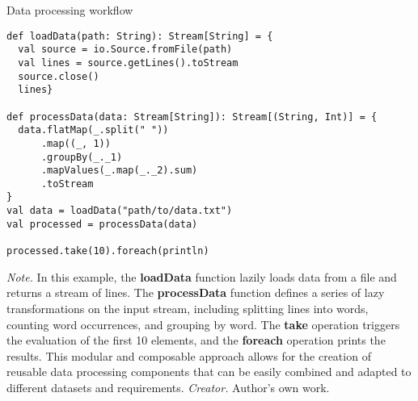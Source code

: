 \begin{table}[h!]
\caption{Data processing workflow}
\begin{lstlisting}
def loadData(path: String): Stream[String] = {
  val source = io.Source.fromFile(path)
  val lines = source.getLines().toStream
  source.close()
  lines}
  
def processData(data: Stream[String]): Stream[(String, Int)] = {
  data.flatMap(_.split(" "))
      .map((_, 1))
      .groupBy(_._1)
      .mapValues(_.map(_._2).sum)
      .toStream
}
val data = loadData("path/to/data.txt")
val processed = processData(data)

processed.take(10).foreach(println)
\end{lstlisting}
\small
\textit{Note.} In this example, the \textbf{loadData} function lazily loads data from a file and returns a stream of lines. The \textbf{processData} function defines a series of lazy transformations on the input stream, including splitting lines into words, counting word occurrences, and grouping by word. The \textbf{take} operation triggers the evaluation of the first 10 elements, and the \textbf{foreach} operation prints the results. This modular and composable approach allows for the creation of reusable data processing components that can be easily combined and adapted to different datasets and requirements.
\textit{Creator.} Author's own work.
\end{table}